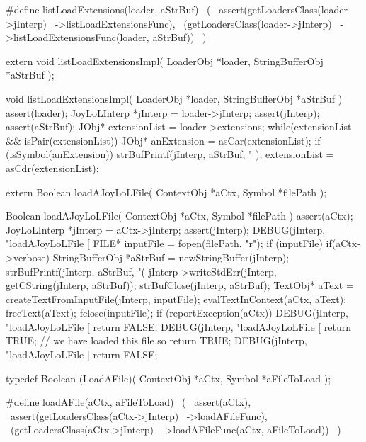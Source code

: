 \startCHeader
#define listLoadExtensions(loader, aStrBuf)      \
  (                                              \
    assert(getLoadersClass(loader->jInterp)      \
      ->listLoadExtensionsFunc),                 \
    (getLoadersClass(loader->jInterp)            \
      ->listLoadExtensionsFunc(loader, aStrBuf)) \
  )
\stopCHeader

\setCHeaderStream{private}
\startCHeader
extern void listLoadExtensionsImpl(
  LoaderObj       *loader,
  StringBufferObj *aStrBuf
);
\stopCHeader
{}

\startCCode
void listLoadExtensionsImpl(
  LoaderObj       *loader,
  StringBufferObj *aStrBuf
) {
  assert(loader);
  JoyLoLInterp *jInterp = loader->jInterp;
  assert(jInterp);
  assert(aStrBuf);
  JObj* extensionList = loader->extensions;
  while(extensionList && isPair(extensionList)) {
    JObj* anExtension = asCar(extensionList);
    if (isSymbol(anExtension)) {
      strBufPrintf(jInterp, aStrBuf,
        "%
      );
    }
    extensionList = asCdr(extensionList);
  }
}
\stopCCode

\startCHeader
extern Boolean loadAJoyLoLFile(
  ContextObj *aCtx,
  Symbol     *filePath
);
\stopCHeader
{}

\startCCode
Boolean loadAJoyLoLFile(
  ContextObj *aCtx,
  Symbol     *filePath
) {
  assert(aCtx);
  JoyLoLInterp *jInterp = aCtx->jInterp;
  assert(jInterp);
  DEBUG(jInterp, "loadAJoyLoLFile [%
  FILE* inputFile = fopen(filePath, "r");
  if (inputFile) {
    if(aCtx->verbose) {
      StringBufferObj *aStrBuf = 
        newStringBuffer(jInterp);      
      strBufPrintf(jInterp, aStrBuf, "(%
      jInterp->writeStdErr(jInterp, getCString(jInterp, aStrBuf));
      strBufClose(jInterp, aStrBuf);
    }
    TextObj* aText =
      createTextFromInputFile(jInterp, inputFile);
    evalTextInContext(aCtx, aText);
    freeText(aText);
    fclose(inputFile);
    if (reportException(aCtx)) {
      DEBUG(jInterp, "loadAJoyLoLFile [%
      return FALSE;
    }
    DEBUG(jInterp, "loadAJoyLoLFile [%
    return TRUE; // we have loaded this file so return TRUE;
  }
  DEBUG(jInterp, "loadAJoyLoLFile [%
  return FALSE;
}
\stopCCode

\startCHeader
typedef Boolean (LoadAFile)(
  ContextObj *aCtx,
  Symbol     *aFileToLoad
);

#define loadAFile(aCtx, aFileToLoad)       \
  (                                        \
    assert(aCtx),                          \
    assert(getLoadersClass(aCtx->jInterp)  \
      ->loadAFileFunc),                    \
    (getLoadersClass(aCtx->jInterp)        \
      ->loadAFileFunc(aCtx, aFileToLoad))  \
  )
\stopCHeader

